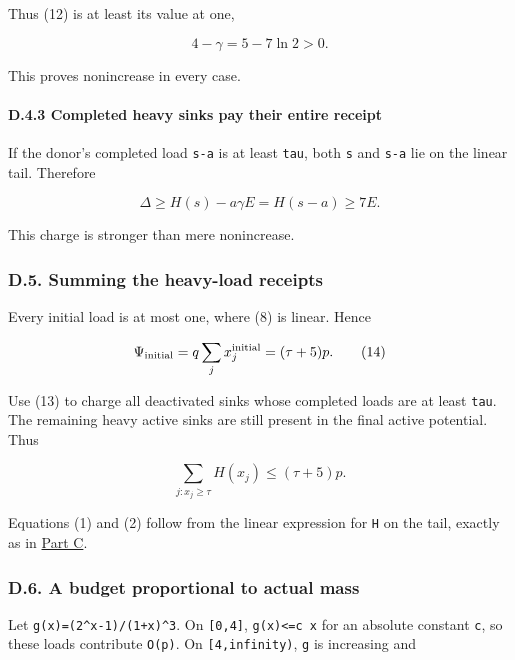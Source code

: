 Thus (12) is at least its value at one,

\[
4-\gamma=5-7\ln2>0.
\]

This proves nonincrease in every case.

\hypertarget{af-385fd70686-d.4.3-completed-heavy-sinks-pay-their-entire-receipt}{%
\paragraph{D.4.3 Completed heavy sinks pay their entire receipt}\label{af-385fd70686-d.4.3-completed-heavy-sinks-pay-their-entire-receipt}}

If the donor's completed load \texttt{s-a} is at least \texttt{tau}, both \texttt{s} and \texttt{s-a} lie on the linear tail. Therefore

\[
\Delta\ge H(s)-a\gamma E=H(s-a)\ge7E.            \tag{13}
\]

This charge is stronger than mere nonincrease.

\hypertarget{af-385fd70686-d.5.-summing-the-heavy-load-receipts}{%
\subsubsection{D.5. Summing the heavy-load receipts}\label{af-385fd70686-d.5.-summing-the-heavy-load-receipts}}

Every initial load is at most one, where (8) is linear. Hence

\[
\Psi_{\rm initial}=q\sum_j x_j^{\rm initial}
                   =(\tau+5)p.                  \tag{14}
\]

Use (13) to charge all deactivated sinks whose completed loads are at least \texttt{tau}. The remaining heavy active sinks are still present in the final active potential. Thus

\[
\sum_{j:x_j\ge\tau}H(x_j)\le(\tau+5)p.          \tag{15}
\]

Equations (1) and (2) follow from the linear expression for \texttt{H} on the tail, exactly as in \protect\hyperlink{af-385fd70686-load-tail}{Part C}.

\hypertarget{af-385fd70686-d.6.-a-budget-proportional-to-actual-mass}{%
\subsubsection{D.6. A budget proportional to actual mass}\label{af-385fd70686-d.6.-a-budget-proportional-to-actual-mass}}

Let \texttt{g(x)=(2\^{}x-1)/(1+x)\^{}3}. On \texttt{{[}0,4{]}}, \texttt{g(x)\textless{}=c\ x} for an absolute constant \texttt{c}, so these loads contribute \texttt{O(p)}. On \texttt{{[}4,infinity)}, \texttt{g} is increasing and

